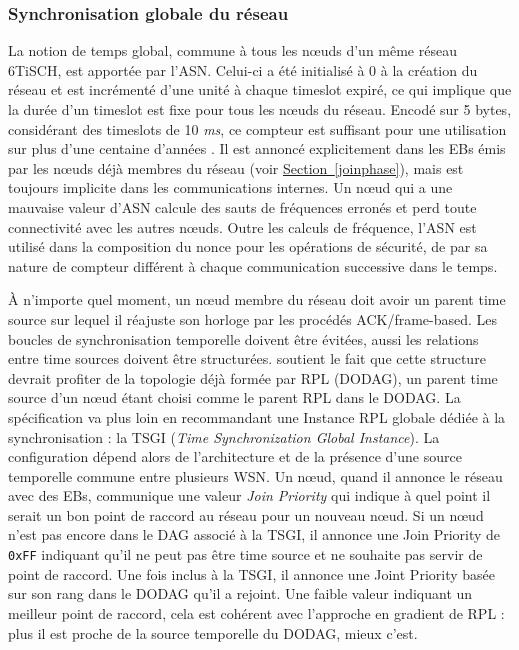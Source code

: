 \documentclass[]{report}
\newcommand{\wordlink}[2]{\hyperref[#2]{#1~\ref{#2}}}
\begin{document}
\subsubsection{Synchronisation globale du réseau}

\par La notion de temps global, commune à tous les nœuds d'un même réseau 6TiSCH, est apportée par l'ASN. Celui-ci a été initialisé à 0 à la création du réseau et est incrémenté d'une unité à chaque timeslot expiré, ce qui implique que la durée d'un timeslot est fixe pour tous les nœuds du réseau. Encodé sur 5 bytes, considérant des timeslots de 10 \textit{ms}, ce compteur est suffisant pour une utilisation sur plus d'une centaine d'années \cite{stack-IoT}. Il est annoncé explicitement dans les EBs émis par les nœuds déjà membres du réseau (voir \wordlink{Section}{joinphase}), mais est toujours implicite dans les communications internes. Un nœud qui a une mauvaise valeur d'ASN calcule des sauts de fréquences erronés et perd toute connectivité avec les autres nœuds. Outre les calculs de fréquence, l'ASN est utilisé dans la composition du nonce pour les opérations de sécurité, de par sa nature de compteur différent à chaque communication successive dans le temps.\\

\par À n'importe quel moment, un nœud membre du réseau doit avoir un parent time source sur lequel il réajuste son horloge par les procédés ACK/frame-based. Les boucles de synchronisation temporelle doivent être évitées, aussi les relations entre time sources doivent être structurées. \cite{ietf-6tisch-minimal-security-15} soutient le fait que cette structure devrait profiter de la topologie déjà formée par RPL (DODAG), un parent time source d'un nœud étant choisi comme le parent RPL dans le DODAG. La spécification \cite{ietf-6tisch-architecture-28} va plus loin en recommandant une Instance RPL globale dédiée à la synchronisation : la TSGI (\textit{Time Synchronization Global Instance}). La configuration dépend alors de l'architecture et de la présence d'une source temporelle commune entre plusieurs WSN. Un nœud, quand il annonce le réseau avec des EBs, communique une valeur \textit{Join Priority} qui indique à quel point il serait un bon point de raccord au réseau pour un nouveau nœud. Si un nœud n'est pas encore dans le DAG associé à la TSGI, il annonce une Join Priority de \texttt{0xFF} indiquant qu'il ne peut pas être time source et ne souhaite pas servir de point de raccord. Une fois inclus à la TSGI, il annonce une Joint Priority basée sur son rang dans le DODAG qu'il a rejoint. Une faible valeur indiquant un meilleur point de raccord, cela est cohérent avec l'approche en gradient de RPL : plus il est proche de la source temporelle du DODAG, mieux c'est.\\
\end{document}
